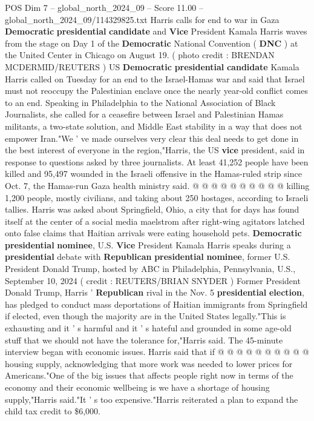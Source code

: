 \begin{textsample}{POS Dim 7 – global\_north\_2024\_09 – Score 11.00 – global\_north\_2024\_09/114329825.txt}  \label{ex:f7_pos_080}
Harris calls for end to war in Gaza \textbf{Democratic} \textbf{presidential} \textbf{candidate} and \textbf{Vice} President Kamala Harris waves from the stage on Day 1 of the \textbf{Democratic} National Convention ( \textbf{DNC} ) at the United Center in Chicago on August 19. ( photo credit : BRENDAN MCDERMID/REUTERS ) US \textbf{Democratic} \textbf{presidential} \textbf{candidate} Kamala Harris called on Tuesday for an end to the Israel-Hamas war and said that Israel must not reoccupy the Palestinian enclave once the nearly year-old conflict comes to an end.
Speaking in Philadelphia to the National Association of Black Journalists, she called for a ceasefire between Israel and Palestinian Hamas militants, a two-state solution, and Middle East stability in a way that does not empower Iran."We ' ve made ourselves very clear this deal needs to get done in the best interest of everyone in the region,"Harris, the US \textbf{vice} president, said in response to questions asked by three journalists.
At least 41,252 people have been killed and 95,497 wounded in the Israeli offensive in the Hamas-ruled strip since Oct. 7, the Hamas-run Gaza health ministry said. @ @ @ @ @ @ @ @ @ @ killing 1,200 people, mostly civilians, and taking about 250 hostages, according to Israeli tallies.
Harris was asked about Springfield, Ohio, a city that for days has found itself at the center of a social media maelstrom after right-wing agitators latched onto false claims that Haitian arrivals were eating household pets. \textbf{Democratic} \textbf{presidential} \textbf{nominee}, U.S. \textbf{Vice} President Kamala Harris speaks during a \textbf{presidential} debate with \textbf{Republican} \textbf{presidential} \textbf{nominee}, former U.S.
President Donald Trump, hosted by ABC in Philadelphia, Pennsylvania, U.S., September 10, 2024 ( credit : REUTERS/BRIAN SNYDER ) Former President Donald Trump, Harris ' \textbf{Republican} rival in the Nov. 5 \textbf{presidential} \textbf{election}, has pledged to conduct mass deportations of Haitian immigrants from Springfield if elected, even though the majority are in the United States legally."This is exhausting and it ' s harmful and it ' s hateful and grounded in some age-old stuff that we should not have the tolerance for,"Harris said.
The 45-minute interview began with economic issues.
Harris said that if @ @ @ @ @ @ @ @ @ @ housing supply, acknowledging that more work was needed to lower prices for Americans."One of the big issues that affects people right now in terms of the economy and their economic wellbeing is we have a shortage of housing supply,"Harris said."It ' s too expensive."Harris reiterated a plan to expand the child tax credit to \$6,000.

\end{textsample}
